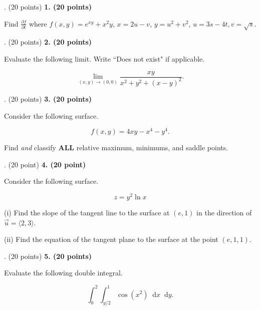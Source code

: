\documentclass[12pt]{article}
\makeatletter
\newcommand*\dif{\mathop{}\!\mathrm{d}}
\newenvironment{problem}[1][]{%
  \bigskip%
  \noindent\begin{boxedminipage}{\columnwidth}%
  \def\@tempa{#1}%
  \ifx\@tempa\empty\else%
    \textbf{#1}\hspace{0.5em}%
  \fi%
}{%
  \end{boxedminipage}%
}
\makeatother
\begin{document}
\newpage
\begin{problem}[1. (20 points)]
Find $\frac{\partial f}{\partial t}$ where $f(x,y) = e^{xy}+ x^2y$, $x = 2u-v$, $y = u^2+v^2$, $u = 3s-4t, v = \sqrt{s}$.
\end{problem}


\newpage
\begin{problem}[2. (20 points)]
Evaluate the following limit. Write ``Does not exist" if applicable.

\begin{equation*}
    \lim_{(x,y) \to (0,0)} \frac{xy}{x^2+y^2 + (x-y)^2}.
\end{equation*}
\end{problem}



\newpage
\begin{problem}[3. (20 points)]
Consider the following surface.

\begin{equation*}
    f(x,y) = 4xy-x^4-y^4.
\end{equation*}

Find \emph{and} classify \textbf{ALL} relative maximum,  minimums, and saddle points.
\end{problem}


\newpage
\begin{problem}[4. (20 point)]
Consider the following surface.

\begin{equation*}
    z = y^2\ln{x}
\end{equation*}

\vspace{.125cm}

(i) Find the slope of the tangent line to the surface at $(e,1)$ in the direction of $\vec{u} = \langle 2, 3 \rangle$.

\vspace{.25cm}

(ii) Find the equation of the tangent plane to the surface at the point $(e,1,1)$.
\end{problem}




\newpage
\begin{problem}[5. (20 points)]
Evaluate the following double integral.

\begin{equation*}
    \int_0^2 \int_{y/2}^1 \cos{(x^2)} \dif{x}\dif{y}.
\end{equation*}

\end{problem}
\end{document}
